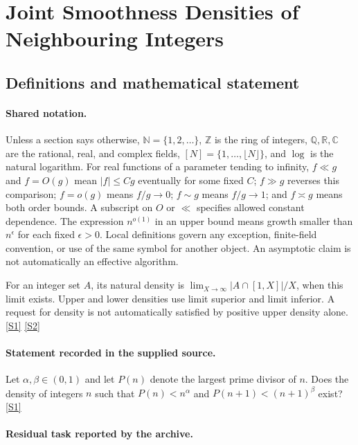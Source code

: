 \documentclass[11pt,a4paper]{article}
\newcommand{\N}{\mathbb{N}}
\newcommand{\Z}{\mathbb{Z}}
\newcommand{\Q}{\mathbb{Q}}
\newcommand{\R}{\mathbb{R}}
\newcommand{\C}{\mathbb{C}}
\newcommand{\sref}[2]{\hyperlink{source:#1:#2}{[S#2]}}
\begin{document}
\section{Joint Smoothness Densities of Neighbouring Integers}\label{statement}


\subsection{Definitions and mathematical statement}

\paragraph{Shared notation.}Unless a section says otherwise, $\N=\{1,2,\ldots\}$,
$\Z$ is the ring of integers, $\Q,\R,\C$ are the rational, real, and complex
fields, $[N]=\{1,\ldots,\lfloor N\rfloor\}$, and $\log$ is the natural
logarithm. For real functions of a parameter tending to infinity,
$f\ll g$ and $f=O(g)$ mean $|f|\leq Cg$ eventually for some fixed $C$;
$f\gg g$ reverses this comparison; $f=o(g)$ means $f/g\to0$;
$f\sim g$ means $f/g\to1$; and $f\asymp g$ means both order bounds.
A subscript on $O$ or $\ll$ specifies allowed constant dependence.
The expression $n^{o(1)}$ in an upper bound means growth smaller than
$n^\epsilon$ for each fixed $\epsilon>0$. Local definitions govern any
exception, finite-field convention, or use of the same symbol for another
object. An asymptotic claim is not automatically an effective algorithm.



For an integer set $A$, its natural density is $\lim_{X\to\infty}|A\cap[1,X]|/X$, when this limit exists. Upper and lower densities use limit superior and limit inferior. A request for density is not automatically satisfied by positive upper density alone. \sref{statement}{1} \sref{statement}{2}

\paragraph{Statement recorded in the supplied source.}
Let $\alpha,\beta\in (0,1)$ and let $P(n)$ denote the largest prime divisor of $n$. Does the density of integers $n$ such that $P(n)<n^{\alpha}$ and $P(n+1)<(n+1)^\beta$ exist? \sref{statement}{1}

\paragraph{Residual task reported by the archive.}
\end{document}
